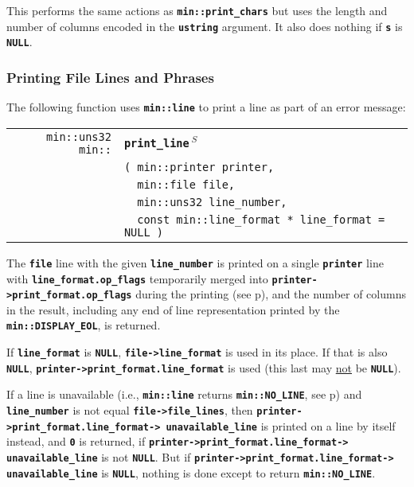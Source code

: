 \documentclass[12pt]{article}
\makeatletter
\newcommand{\TT}[1]{{\tt \bfseries #1}}
\newcommand{\ttindex}[1]{\index{#1@{\tt #1}}}
\newcommand{\pagref}[1]{p\pageref{#1}}
\newcommand{\EOL}{\penalty \exhyphenpenalty}
\newenvironment{indpar}[1][0.3in]%
	{\begin{list}{}%
		     {\setlength{\itemsep}{0in}%
		      \setlength{\topsep}{0in}%
		      \setlength{\parsep}{1ex}%
		      \setlength{\labelwidth}{#1}%
		      \setlength{\leftmargin}{#1}%
		      \addtolength{\leftmargin}{\labelsep}}%
	 \item}%
	{\end{list}}
\newcommand{\LABEL}[1]{\label{#1}}
\newlength{\ARGBREAKLENGTH}
\newcommand{\ARGBREAK}[1][\ARGBREAKLENGTH]{\\&\hspace*{#1}}
\newcommand{\MINKEY}[1]%
	   {\TT{#1}\ttindex{min::#1}\ttindex{#1}}
\newcommand{\RESIZE}{$\,^S$}
\makeatother
\begin{document}
This performs the same actions as \TT{min::print\_chars} but
uses the length and number of columns encoded in the
\TT{ustring} argument.  It also does nothing if \TT{s} is \TT{NULL}.


\subsubsection{Printing File Lines and Phrases}
\label{PRINTING-FILE-LINES-AND-PHRASES}

The following function uses \TT{min::line} to print a line as part of
an error message:

\begin{indpar}[1em]\begin{tabular}{r@{}l}
\verb|min::uns32 min::|
    & \MINKEY{print\_\EOL line\RESIZE}\ARGBREAK
      \verb|( min::printer printer,|\ARGBREAK
      \verb|  min::file file,|\ARGBREAK
      \verb|  min::uns32 line_number,|\ARGBREAK
      \verb|  const min::line_format * line_format = NULL )|
\LABEL{MIN::PRINT_LINE} \\
\end{tabular}\end{indpar}

The \TT{file} line with the given \TT{line\_number}
is printed on a single \TT{printer} line with
\TT{line\_\EOL format\EOL .op\_\EOL flags}
temporarily merged into
\TT{printer->\EOL print\_\EOL format.op\_\EOL flags} during the printing
(see \pagref{FILE_LINE_FORMAT}),
and the number of columns in the result,
including any end of line representation printed by the
\TT{min::\EOL DISPLAY\_\EOL EOL}, is returned.

If \TT{line\_\EOL format} is \TT{NULL},
\TT{file->line\_\EOL format} is used in its place.  If that is also
\TT{NULL},
\TT{printer->\EOL print\_\EOL format.line\_\EOL format} is used (this
last may \underline{not} be \TT{NULL}).

If a line is
unavailable (i.e., \TT{min::\EOL line} returns \TT{min::\EOL NO\_\EOL LINE},
see \pagref{MIN::LINE_OF_FILE})
and \TT{line\_\EOL number} is not equal \TT{file->\EOL file\_\EOL lines},
then \TT{printer->\EOL print\_\EOL format\EOL .line\_\EOL format->\EOL
unavail\-able\_\EOL line} is
printed on a line by itself instead, and \TT{0} is returned,
if \TT{printer->\EOL print\_\EOL format\EOL .line\_\EOL format->\EOL
unavailable\_\EOL line} is not \TT{NULL}.
But if \TT{printer->\EOL print\_\EOL format\EOL .line\_\EOL format->\EOL
unavailable\_\EOL line} is \TT{NULL},
nothing is done except to return \TT{min::\EOL NO\_\EOL LINE}.
\end{document}

